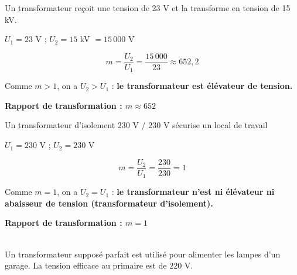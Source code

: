 \documentclass[11pt,a4paper]{article}
\begin{document}
\vfill 

 Un transformateur  reçoit une tension de 23 V et la transforme en tension de 15 kV. 

\begin{tcolorbox}[colback=red!5!white,colframe=red!75!black]
{\color{blue}
$U_1 = 23$ V \quad ; \quad $U_2 = 15$ kV $= 15\,000$ V

$$m = \dfrac{U_2}{U_1} = \dfrac{15\,000}{23} \approx 652{,}2$$

Comme $m > 1$, on a $U_2 > U_1$ : \textbf{le transformateur est élévateur de tension.}

\textbf{Rapport de transformation : $m \approx 652$}
}
\end{tcolorbox}

\vfill 

 Un transformateur d'isolement 230 V / 230 V sécurise un local de travail 

\begin{tcolorbox}[colback=red!5!white,colframe=red!75!black]
{\color{blue}
$U_1 = 230$ V \quad ; \quad $U_2 = 230$ V

$$m = \dfrac{U_2}{U_1} = \dfrac{230}{230} = 1$$

Comme $m = 1$, on a $U_2 = U_1$ : \textbf{le transformateur n'est ni élévateur ni abaisseur de tension (transformateur d'isolement).}

\textbf{Rapport de transformation : $m = 1$}
}
\end{tcolorbox}

\vfill 


\newpage 

 \\[2mm]

Un transformateur supposé parfait est utilisé pour alimenter les lampes d'un garage.  La tension efficace au primaire est de 220 V. 
\end{document}
